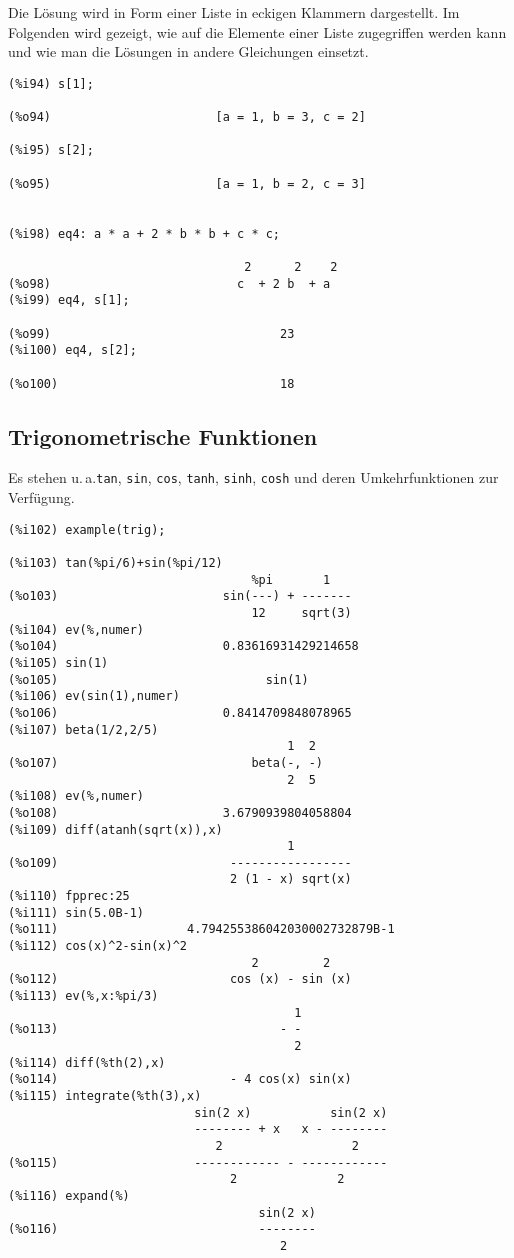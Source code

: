 \documentclass[ngerman,12pt]{scrartcl}
\newcommand*\ua{u.\,a.\xspace}
\begin{document}
Die Lösung wird in Form einer Liste in eckigen Klammern dargestellt.
Im Folgenden wird gezeigt, wie auf die Elemente  einer Liste
zugegriffen werden kann und wie man die  Lösungen in andere
Gleichungen einsetzt.

\begin{verbatim}
(%i94) s[1];

(%o94)                       [a = 1, b = 3, c = 2]

(%i95) s[2];

(%o95)                       [a = 1, b = 2, c = 3]


(%i98) eq4: a * a + 2 * b * b + c * c;

                                 2      2    2
(%o98)                          c  + 2 b  + a
(%i99) eq4, s[1];

(%o99)                                23
(%i100) eq4, s[2];

(%o100)                               18
\end{verbatim}

\subsection{Trigonometrische Funktionen}

Es stehen \ua\@ \texttt{tan}, \texttt{sin}, \texttt{cos},
\texttt{tanh}, \texttt{sinh}, \texttt{cosh} und deren Umkehrfunktionen
zur Verfügung.

\begin{verbatim}
(%i102) example(trig);

(%i103) tan(%pi/6)+sin(%pi/12)
                                  %pi       1
(%o103)                       sin(---) + -------
                                  12     sqrt(3)
(%i104) ev(%,numer)
(%o104)                       0.83616931429214658
(%i105) sin(1)
(%o105)                             sin(1)
(%i106) ev(sin(1),numer)
(%o106)                       0.8414709848078965
(%i107) beta(1/2,2/5)
                                       1  2
(%o107)                           beta(-, -)
                                       2  5
(%i108) ev(%,numer)
(%o108)                       3.6790939804058804
(%i109) diff(atanh(sqrt(x)),x)
                                       1
(%o109)                        -----------------
                               2 (1 - x) sqrt(x)
(%i110) fpprec:25
(%i111) sin(5.0B-1)
(%o111)                  4.794255386042030002732879B-1
(%i112) cos(x)^2-sin(x)^2
                                  2         2
(%o112)                        cos (x) - sin (x)
(%i113) ev(%,x:%pi/3)
                                        1
(%o113)                               - -
                                        2
(%i114) diff(%th(2),x)
(%o114)                        - 4 cos(x) sin(x)
(%i115) integrate(%th(3),x)
                          sin(2 x)           sin(2 x)
                          -------- + x   x - --------
                             2                  2
(%o115)                   ------------ - ------------
                               2              2
(%i116) expand(%)
                                   sin(2 x)
(%o116)                            --------
                                      2
\end{verbatim}
\end{document}
